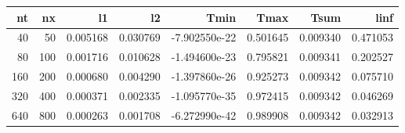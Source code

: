 \begin{tabular}{rrrrrrrr}
\toprule
  nt &   nx &        l1 &        l2 &          Tmin &      Tmax &      Tsum &      linf \\
\midrule
  40 &   50 &  0.005168 &  0.030769 & -7.902550e-22 &  0.501645 &  0.009340 &  0.471053 \\
  80 &  100 &  0.001716 &  0.010628 & -1.494600e-23 &  0.795821 &  0.009341 &  0.202527 \\
 160 &  200 &  0.000680 &  0.004290 & -1.397860e-26 &  0.925273 &  0.009342 &  0.075710 \\
 320 &  400 &  0.000371 &  0.002335 & -1.095770e-35 &  0.972415 &  0.009342 &  0.046269 \\
 640 &  800 &  0.000263 &  0.001708 & -6.272990e-42 &  0.989908 &  0.009342 &  0.032913 \\
\bottomrule
\end{tabular}
